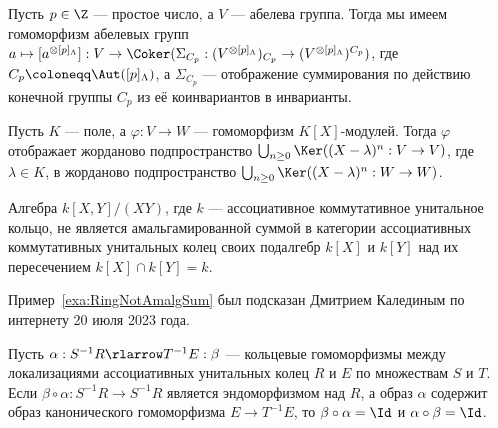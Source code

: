 \documentclass[
	extrafontsizes,
	11pt,
	hyphens,
]{memoir}
\begin{document}

\begin{observation}
Пусть \(p \in \Z\) --- простое число, а \(V\) --- абелева группа.
Тогда мы имеем гомоморфизм абелевых групп
\(
a \mapsto [a^{\otimes [p]_\Lambda}] :
V \to \Coker(\Sigma_{C_p} : (V^{\otimes [p]_\Lambda})_{C_p} \to (V^{\otimes [p]_\Lambda})^{C_p})
\),
где \(C_p \coloneqq \Aut([p]_\Lambda)\), а \(\Sigma_{C_p}\) --- отображение суммирования по действию конечной группы \(C_p\) из её коинвариантов в инварианты.
\end{observation}

\begin{observation}
Пусть \(K\) --- поле, а \(\varphi: V \to W\) --- гомоморфизм \(K[X]\)-модулей.
Тогда \(\varphi\) отображает жорданово подпространство
\(\bigcup_{n \geq 0} \Ker((X - \lambda)^n : V \to V)\),
где \(\lambda \in K\), в жорданово подпространство
\(\bigcup_{n \geq 0} \Ker((X - \lambda)^n : W \to W)\).
\end{observation}

\begin{example}
Алгебра \(k[X,Y]/(XY)\), где \(k\) --- ассоциативное коммутативное унитальное кольцо,%
\label{exa:RingNotAmalgSum}
не является амальгамированной суммой в категории ассоциативных коммутативных унитальных колец своих подалгебр \(k[X]\) и \(k[Y]\) над их пересечением \(k[X] \cap k[Y] = k\).
\end{example}

\begin{remark}
Пример~\ref{exa:RingNotAmalgSum} был подсказан Дмитрием Калединым по интернету 20 июля 2023 года.
\end{remark}

\begin{statement}
Пусть
\(\alpha: S^{-1}R \rlarrow T^{-1}E : \beta\) --- кольцевые гомоморфизмы
между локализациями ассоциативных унитальных колец \(R\) и \(E\) по множествам \(S\) и \(T\).
Если \(\beta \circ \alpha: S^{-1}R \to S^{-1}R\) является эндоморфизмом над \(R\), а образ \(\alpha\) содержит 
образ канонического гомоморфизма \(E \to T^{-1}E\),
то \(\beta \circ \alpha = \Id\) и \(\alpha \circ \beta = \Id\).
\end{statement}
\end{document}
